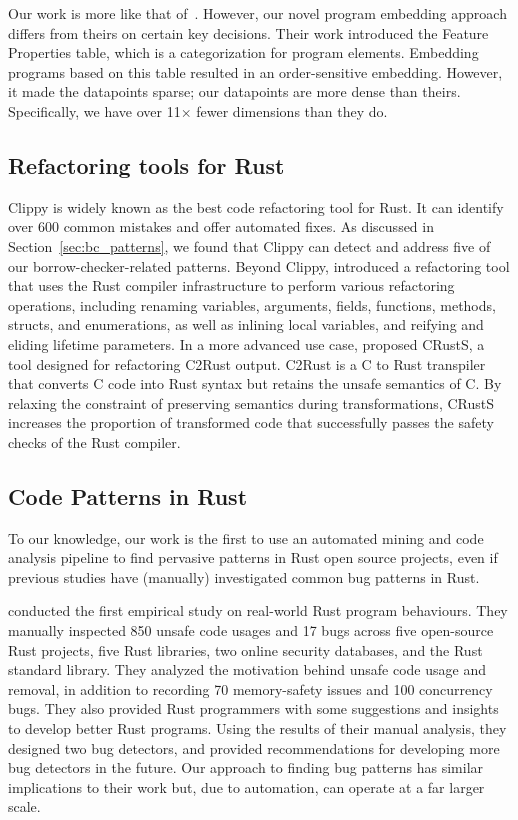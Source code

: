 Our work is more like that of~\cite{hanam2016discovering}. However, our novel program embedding approach differs from theirs on certain key decisions. Their work introduced the Feature Properties table, which is a categorization for program elements. Embedding programs based on this table resulted in an order-sensitive embedding. However, it made the datapoints sparse; our datapoints are more dense than theirs. Specifically, we have over 11$\times$ fewer dimensions than they do.

\subsection{Refactoring tools for Rust}
Clippy is widely known as the best code refactoring tool for Rust. It can identify over 600 common mistakes and offer automated fixes.
As discussed in Section~\ref{sec:bc_patterns}, we found that Clippy can detect and address five of our borrow-checker-related patterns. Beyond Clippy, \cite{sam2017automated} introduced a refactoring tool that uses the Rust compiler infrastructure to perform various refactoring operations, including renaming variables, arguments, fields, functions, methods, structs, and enumerations, as well as inlining local variables, and reifying and eliding lifetime parameters. In a more advanced use case, \cite{ling2022rust} proposed CRustS, a tool designed for refactoring C2Rust output. C2Rust is a C to Rust transpiler that converts C code into Rust syntax but retains the unsafe semantics of C. By relaxing the constraint of preserving semantics during transformations, CRustS increases the proportion of transformed code that successfully passes the safety checks of the Rust compiler.

\subsection{Code Patterns in Rust}

To our knowledge, our work is the first to use an automated mining and code analysis pipeline to find pervasive patterns in Rust open source projects, even if previous studies have (manually) investigated common bug patterns in Rust.

\cite{qin2020understanding} conducted the first empirical study on real-world Rust program behaviours. They manually inspected 850 unsafe code usages and 17 bugs across five open-source Rust projects, five Rust libraries, two online security databases, and the Rust standard library. They analyzed the motivation behind unsafe code usage and removal, in addition to recording 70 memory-safety issues and 100 concurrency bugs. They also provided Rust programmers with some suggestions and insights to develop better Rust programs. Using the results of their manual analysis, they designed two bug detectors, and provided recommendations for developing more bug detectors in the future. Our approach to finding bug patterns has similar implications to their work but, due to automation, can operate at a far larger scale.

